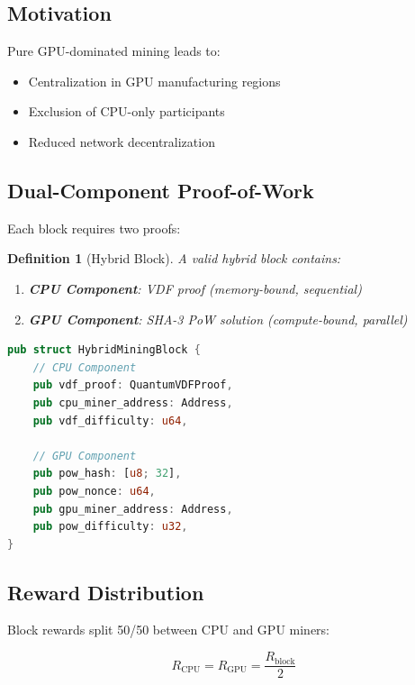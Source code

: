 \documentclass[11pt,a4paper]{article}
\newtheorem{definition}[theorem]{Definition}
\begin{document}
\subsection{Motivation}

Pure GPU-dominated mining leads to:
\begin{itemize}
    \item Centralization in GPU manufacturing regions
    \item Exclusion of CPU-only participants
    \item Reduced network decentralization
\end{itemize}

\subsection{Dual-Component Proof-of-Work}

Each block requires two proofs:

\begin{definition}[Hybrid Block]
A valid hybrid block contains:
\begin{enumerate}
    \item \textbf{CPU Component}: VDF proof (memory-bound, sequential)
    \item \textbf{GPU Component}: SHA-3 PoW solution (compute-bound, parallel)
\end{enumerate}
\end{definition}

\begin{lstlisting}[language=Rust, caption=Hybrid Mining Block]
pub struct HybridMiningBlock {
    // CPU Component
    pub vdf_proof: QuantumVDFProof,
    pub cpu_miner_address: Address,
    pub vdf_difficulty: u64,

    // GPU Component
    pub pow_hash: [u8; 32],
    pub pow_nonce: u64,
    pub gpu_miner_address: Address,
    pub pow_difficulty: u32,
}
\end{lstlisting}

\subsection{Reward Distribution}

Block rewards split 50/50 between CPU and GPU miners:

\begin{equation}
    R_{\text{CPU}} = R_{\text{GPU}} = \frac{R_{\text{block}}}{2}
\end{equation}
\end{document}
